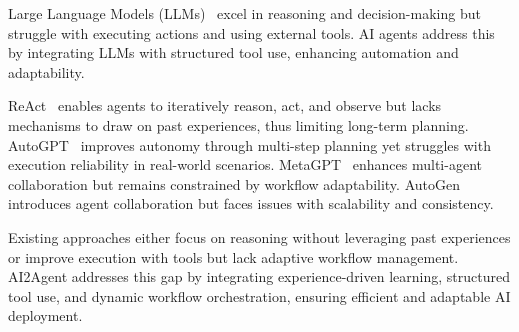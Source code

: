 Large Language Models (LLMs)~\cite{GPTs} excel in reasoning and decision-making but struggle with executing actions and using external tools. AI agents address this by integrating LLMs with structured tool use, enhancing automation and adaptability.

ReAct~\cite{react} enables agents to iteratively reason, act, and observe but lacks mechanisms to draw on past experiences, thus limiting long-term planning. AutoGPT~\cite{autogpt} improves autonomy through multi-step planning yet struggles with execution reliability in real-world scenarios. MetaGPT~\cite{metagpt} enhances multi-agent collaboration but remains constrained by workflow adaptability. AutoGen~\cite{autogen} introduces agent collaboration but faces issues with scalability and consistency.

Existing approaches either focus on reasoning without leveraging past experiences or improve execution with tools but lack adaptive workflow management. AI2Agent addresses this gap by integrating experience-driven learning, structured tool use, and dynamic workflow orchestration, ensuring efficient and adaptable AI deployment.